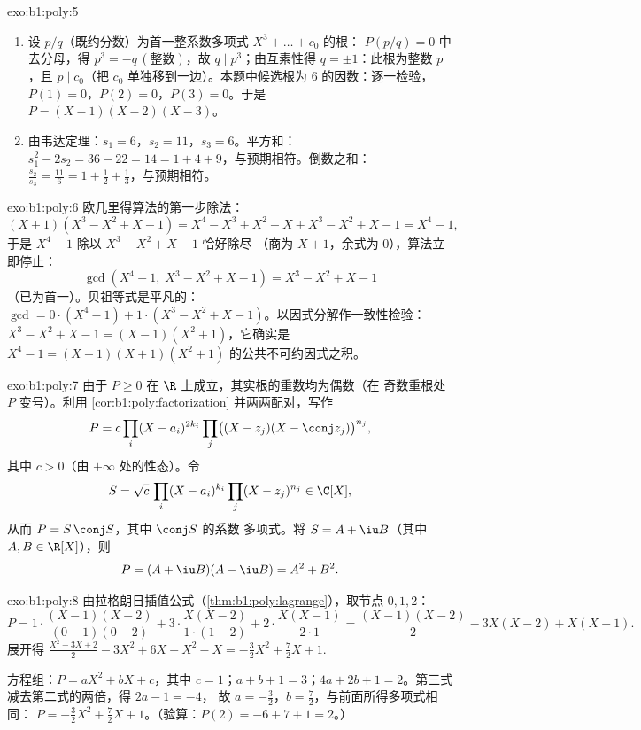 \begin{solution}{exo:b1:poly:5}
\begin{enumerate}
  \item 设 $p/q$（既约分数）为首一整系数多项式
        $X^3 + \dots + c_0$ 的根：
        $P(p/q) = 0$ 中去分母，得 $p^3 = -q\,(\text{整数})$，故 $q \mid
        p^3$；由互素性得 $q = \pm 1$：此根为整数
        $p$，且 $p \mid c_0$（把 $c_0$ 单独移到一边）。本题中候选根为
        $6$ 的因数：逐一检验，$P(1) = 0$，$P(2) = 0$，$P(3) = 0$。于是
        $P = (X-1)(X-2)(X-3)$。
  \item 由韦达定理：$s_1 = 6$，$s_2 = 11$，$s_3 = 6$。平方和：
        $s_1^2 - 2s_2 = 36 - 22 = 14 = 1 + 4 + 9$，与预期相符。倒数之和：
        $\frac{s_2}{s_3} = \frac{11}{6} = 1 + \frac12 + \frac13$，与预期相符。
\end{enumerate}
\end{solution}

\begin{solution}{exo:b1:poly:6}
欧几里得算法的第一步除法：
\[
(X + 1)(X^3 - X^2 + X - 1)
= X^4 - X^3 + X^2 - X + X^3 - X^2 + X - 1 = X^4 - 1 ,
\]
于是 $X^4 - 1$ 除以 $X^3 - X^2 + X - 1$ 恰好除尽
（商为 $X + 1$，余式为 $0$），算法立即停止：
\[
\gcd(X^4 - 1,\; X^3 - X^2 + X - 1) = X^3 - X^2 + X - 1
\]
（已为首一）。贝祖等式是平凡的：$\gcd = 0
\cdot (X^4 - 1) + 1 \cdot (X^3 - X^2 + X - 1)$。以因式分解作一致性检验：
$X^3 - X^2 + X - 1 = (X - 1)(X^2 + 1)$，它确实是
$X^4 - 1 =
(X-1)(X+1)(X^2+1)$ 的公共不可约因式之积。
\end{solution}

\begin{solution}{exo:b1:poly:7}
由于 $P \geq 0$ 在 $\R$ 上成立，其实根的重数均为偶数（在
奇数重根处 $P$ 变号）。利用
\cref{cor:b1:poly:factorization} 并两两配对，写作
\[
P = c \prod_i (X - a_i)^{2k_i} \prod_j \bigl((X - z_j)(X - \conj
z_j)\bigr)^{n_j},
\]
其中 $c > 0$（由 $+\infty$ 处的性态）。令
\[
S = \sqrt c\, \prod_i (X - a_i)^{k_i} \prod_j (X - z_j)^{n_j}
\in \C[X],
\]
从而 $P = S\,\conj S$，其中 $\conj S$ 的系数
多项式。将 $S = A + \iu B$（其中 $A, B \in \R[X]$），则
\[
P = (A + \iu B)(A - \iu B) = A^2 + B^2 .
\]
\end{solution}

\begin{solution}{exo:b1:poly:8}
由拉格朗日插值公式（\cref{thm:b1:poly:lagrange}），取节点 $0, 1, 2$：
\[
P = 1\cdot\frac{(X-1)(X-2)}{(0-1)(0-2)} + 3\cdot\frac{X(X-2)}{1\cdot(1-2)}
+ 2\cdot\frac{X(X-1)}{2\cdot 1}
= \frac{(X-1)(X-2)}{2} - 3X(X-2) + X(X-1).
\]
展开得 $\frac{X^2 - 3X + 2}{2} - 3X^2 + 6X + X^2 - X =
-\frac{3}{2}X^2 + \frac{7}{2}X + 1$.

方程组：$P = aX^2 + bX + c$，其中 $c = 1$；$a + b + 1 = 3$；$4a + 2b +
1 = 2$。第三式减去第二式的两倍，得 $2a - 1 = -4$，
故 $a = -\frac32$，$b = \frac72$，与前面所得多项式相同：
$P = -\frac32 X^2 + \frac72 X + 1$。（验算：$P(2) = -6 + 7 + 1 = 2$。）
\end{solution}

